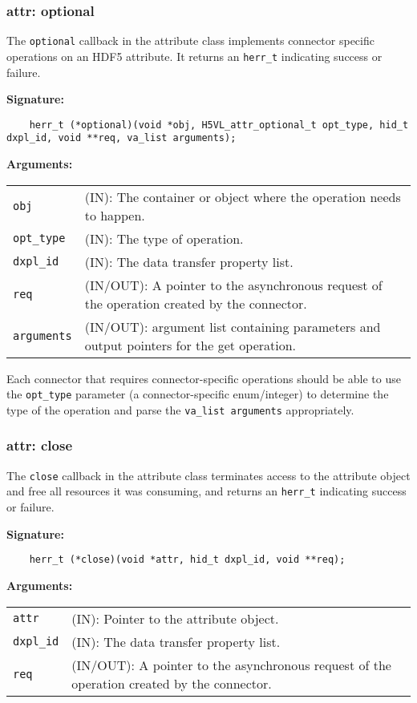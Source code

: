 \subsubsection{attr: optional}
The \texttt{optional} callback in the attribute class implements connector specific operations on an HDF5 attribute. It returns an \texttt{herr\_t} indicating success or failure. \bigskip

\begin{mdframed}[style=bgbox]
\textbf{Signature:}
\begin{lstlisting}
    herr_t (*optional)(void *obj, H5VL_attr_optional_t opt_type, hid_t dxpl_id, void **req, va_list arguments);
\end{lstlisting}

\textbf{Arguments:}\\
\begin{tabular}{l p{13.5cm}}
  \texttt{obj} & (IN): The container or object where the operation needs to happen.\\
  \texttt{opt\_type} & (IN): The type of operation.\\
  \texttt{dxpl\_id} & (IN): The data transfer property list.\\
  \texttt{req} & (IN/OUT): A pointer to the asynchronous request of the operation created by the connector.\\
  \texttt{arguments} & (IN/OUT): argument list containing parameters and output pointers for the get operation. \\
\end{tabular}
\end{mdframed}

Each connector that requires connector-specific operations should be able to use the \texttt{opt\_type} parameter (a connector-specific enum/integer) to determine the type of the operation and parse the \texttt{va\_list arguments} appropriately.

\subsubsection{attr: close}
The \texttt{close} callback in the attribute class terminates
access to the attribute object and free all resources it was
consuming, and returns an \texttt{herr\_t} indicating success or failure.\bigskip

\begin{mdframed}[style=bgbox]
\textbf{Signature:}
\begin{lstlisting}
    herr_t (*close)(void *attr, hid_t dxpl_id, void **req);
\end{lstlisting}

\textbf{Arguments:}\\
\begin{tabular}{l p{13.5cm}}
  \texttt{attr} & (IN): Pointer to the attribute object.\\
  \texttt{dxpl\_id} & (IN): The data transfer property list.\\
  \texttt{req} & (IN/OUT): A pointer to the asynchronous request of the
  operation created by the connector.\\
\end{tabular}
\end{mdframed}

